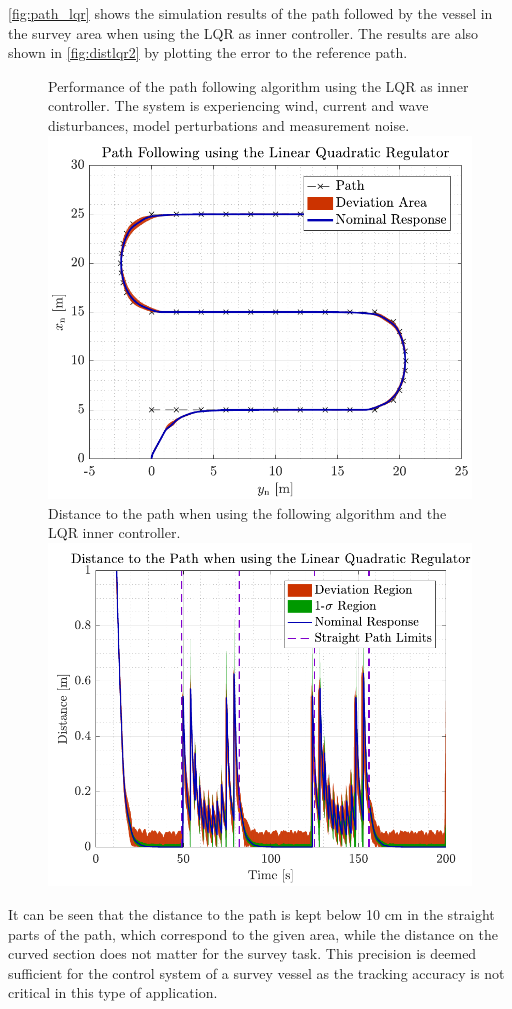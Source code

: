 \autoref{fig:path_lqr} shows the simulation results of the path followed by the vessel in the survey area when using the LQR as inner controller. The results are also shown in \autoref{fig:distlqr2} by plotting the error to the reference path.
\begin{figure}[H]
    \captionbox  
    {            
        Performance of the path following algorithm using the LQR as inner controller. The system is experiencing wind, current and wave disturbances, model perturbations and measurement noise.
        \label{fig:path_lqr}                               
    }                                                                
    {                                                                 
        \includegraphics[width=.45\textwidth]{figures/path_lqr}    
    }                                                                  
    \hspace{5pt}                                                        
    \captionbox 
    {       
        Distance to the path when using the following algorithm and the LQR inner controller.                                                                  %
        \label{fig:distlqr2}                                  
    }                                                                          
    {                                                                            
        \includegraphics[width=.45\textwidth]{figures/dist_lqr}          
    }                                                                            
\end{figure}
It can be seen that the distance to the path is kept below 10 cm in the straight parts of the path, which correspond to the given area, while the distance on the curved section does not matter for the survey task. This precision is deemed sufficient for the control system of a survey vessel as the tracking accuracy is not critical in this type of application.

